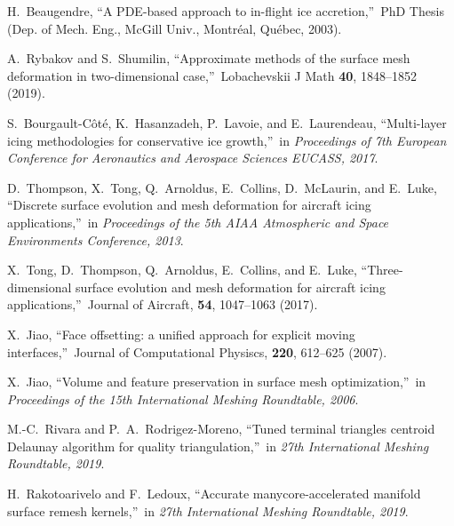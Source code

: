 \documentclass[
11pt,%
tightenlines,%
twoside,%
onecolumn,%
nofloats,%
nobibnotes,%
nofootinbib,%
superscriptaddress,%
noshowpacs,%
centertags]%
{revtex4}
\begin{document}
\begin{thebibliography}{99}

H.~Beaugendre, \textquotedblleft A PDE-based approach to in-flight ice accretion,\textquotedblright \ PhD Thesis (Dep. of Mech. Eng., McGill Univ., Montr\'eal, Qu\'ebec, 2003).

A.~Rybakov and S.~Shumilin, \textquotedblleft Approximate methods of the surface mesh deformation in two-dimensional case,\textquotedblright \ Lobachevskii J Math {\bf 40}, 1848--1852 (2019).

S.~Bourgault-C\^ot\'e, K.~Hasanzadeh, P.~Lavoie, and E.~Laurendeau, \textquotedblleft Multi-layer icing methodologies for conservative ice growth,\textquotedblright \ in \textit{Proceedings of 7th European Conference for Aeronautics and Aerospace Sciences EUCASS, 2017}.

D.~Thompson, X.~Tong, Q.~Arnoldus, E.~Collins, D.~McLaurin, and E.~Luke, \textquotedblleft Discrete surface evolution and mesh deformation for aircraft icing applications,\textquotedblright \ in \textit{Proceedings of the 5th AIAA Atmospheric and Space Environments Conference, 2013}.

X.~Tong, D.~Thompson, Q.~Arnoldus, E.~Collins, and E.~Luke, \textquotedblleft Three-dimensional surface evolution and mesh deformation for aircraft icing applications,\textquotedblright \ Journal of Aircraft, {\bf 54}, 1047--1063 (2017).

X.~Jiao, \textquotedblleft Face offsetting: a unified approach for explicit moving interfaces,\textquotedblright \ Journal of Computational Physiscs, {\bf 220}, 612--625 (2007).

X.~Jiao, \textquotedblleft Volume and feature preservation in surface mesh optimization,\textquotedblright \ in \textit{Proceedings of the 15th International Meshing Roundtable, 2006}.


M.-C.~Rivara and P.~A.~Rodrigez-Moreno, \textquotedblleft Tuned terminal triangles centroid Delaunay algorithm for quality triangulation,\textquotedblright \ in \textit{27th International Meshing Roundtable, 2019}.

H.~Rakotoarivelo and F.~Ledoux, \textquotedblleft Accurate manycore-accelerated manifold surface remesh kernels,\textquotedblright \ in \textit{27th International Meshing Roundtable, 2019}.


\end{thebibliography}
\end{document}
